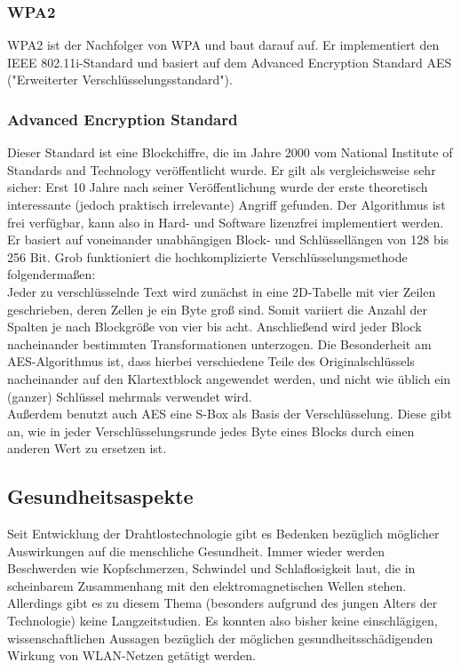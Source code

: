 \documentclass[a4paper,13pt]{scrartcl}
\begin{document}
\subsubsection{WPA2}
WPA2 ist der Nachfolger von WPA und baut darauf auf. Er implementiert den IEEE 802.11i-Standard und basiert auf dem Advanced Encryption Standard AES ("Erweiterter Verschlüsselungsstandard").
\subsubsection{Advanced Encryption Standard}
Dieser Standard ist eine Blockchiffre, die im Jahre 2000 vom National Institute of Standards and Technology veröffentlicht wurde. Er gilt als vergleichsweise sehr sicher: Erst 10 Jahre nach seiner Veröffentlichung wurde der erste theoretisch interessante (jedoch praktisch irrelevante) Angriff gefunden. Der Algorithmus ist frei verfügbar, kann also in Hard- und Software lizenzfrei implementiert werden.\\
Er basiert auf voneinander unabhängigen Block- und Schlüssellängen von 128 bis 256 Bit. Grob funktioniert die hochkomplizierte Verschlüsselungsmethode folgendermaßen:\\
Jeder zu verschlüsselnde Text wird zunächst in eine 2D-Tabelle mit vier Zeilen geschrieben, deren Zellen je ein Byte groß sind. Somit variiert die Anzahl der Spalten je nach Blockgröße von vier bis acht. Anschließend wird jeder Block nacheinander bestimmten Transformationen unterzogen. Die Besonderheit am AES-Algorithmus ist, dass hierbei verschiedene Teile des Originalschlüssels nacheinander auf den Klartextblock angewendet werden, und nicht wie üblich ein (ganzer) Schlüssel mehrmals verwendet wird.\\
Außerdem benutzt auch AES eine S-Box als Basis der Verschlüsselung. Diese gibt an, wie in jeder Verschlüsselungsrunde jedes Byte eines Blocks durch einen anderen Wert zu ersetzen ist.

\subsection{Gesundheitsaspekte}
Seit Entwicklung der Drahtlostechnologie gibt es Bedenken bezüglich möglicher Auswirkungen auf die menschliche Gesundheit. Immer wieder werden Beschwerden wie Kopfschmerzen, Schwindel und Schlaflosigkeit laut, die in scheinbarem Zusammenhang mit den elektromagnetischen Wellen stehen. Allerdings gibt es zu diesem Thema (besonders aufgrund des jungen Alters der Technologie) keine Langzeitstudien. Es konnten also bisher keine einschlägigen, wissenschaftlichen Aussagen bezüglich der möglichen gesundheitsschädigenden Wirkung von WLAN-Netzen getätigt werden.
\clearpage
\end{document}
